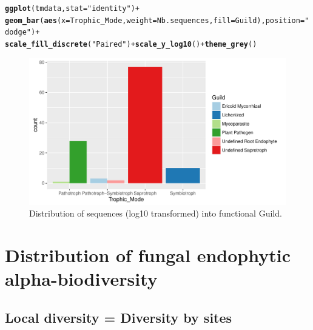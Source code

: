 \documentclass[12pt]{article}\usepackage[]{graphicx}\usepackage[]{color}
\makeatletter
\def\maxwidth{ %
  \ifdim\Gin@nat@width>\linewidth
    \linewidth
  \else
    \Gin@nat@width
  \fi
}
\newcommand{\hlstr}[1]{\textcolor[rgb]{0.192,0.494,0.8}{#1}}%
\newcommand{\hlopt}[1]{\textcolor[rgb]{0,0,0}{#1}}%
\newcommand{\hlstd}[1]{\textcolor[rgb]{0.345,0.345,0.345}{#1}}%
\newcommand{\hlkwc}[1]{\textcolor[rgb]{0.333,0.667,0.333}{#1}}%
\newcommand{\hlkwd}[1]{\textcolor[rgb]{0.737,0.353,0.396}{\textbf{#1}}}%
\newenvironment{kframe}{%
 \def\at@end@of@kframe{}%
 \ifinner\ifhmode%
  \def\at@end@of@kframe{\end{minipage}}%
  \begin{minipage}{\columnwidth}%
 \fi\fi%
 \def\FrameCommand##1{\hskip\@totalleftmargin \hskip-\fboxsep
 \colorbox{shadecolor}{##1}\hskip-\fboxsep
     \hskip-\linewidth \hskip-\@totalleftmargin \hskip\columnwidth}%
 \MakeFramed {\advance\hsize-\width
   \@totalleftmargin\z@ \linewidth\hsize
   \@setminipage}}%
 {\par\unskip\endMakeFramed%
 \at@end@of@kframe}
\newenvironment{knitrout}{}{} %
\numberwithin{figure}{section}
\makeatother
\begin{document}
\begin{knitrout}\small
{}\color{fgcolor}\begin{kframe}
\begin{alltt}
\hlkwd{ggplot}\hlstd{(tmdata,} \hlkwc{stat} \hlstd{=} \hlstr{"identity"}\hlstd{)} \hlopt{+}
  \hlkwd{geom_bar}\hlstd{(}\hlkwd{aes}\hlstd{(}\hlkwc{x} \hlstd{= Trophic_Mode,} \hlkwc{weight} \hlstd{= Nb.sequences,}  \hlkwc{fill} \hlstd{= Guild),} \hlkwc{position} \hlstd{=} \hlstr{"dodge"}\hlstd{)} \hlopt{+}
  \hlkwd{scale_fill_discrete}\hlstd{(}\hlstr{"Paired"}\hlstd{)} \hlopt{+} \hlkwd{scale_y_log10}\hlstd{()} \hlopt{+} \hlkwd{theme_grey}\hlstd{()}
\end{alltt}
\end{kframe}\begin{figure}

{\centering \includegraphics[width=\maxwidth]{figure/unnamed-chunk-33-1} 

}

\caption[Distribution of sequences (log10 transformed) into functional Guild]{Distribution of sequences (log10 transformed) into functional Guild.}\label{fig:unnamed-chunk-33}
\end{figure}


\end{knitrout}

\section{Distribution of fungal endophytic alpha-biodiversity}
  \subsection{Local diversity = Diversity by sites}
\end{document}
